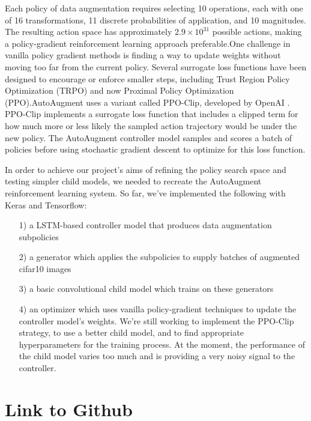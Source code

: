 \documentclass[10pt,twocolumn,letterpaper]{article}
\begin{document}
	Each policy of data augmentation requires selecting 10 operations, each with one of 16 transformations, 11 discrete probabilities of application, and 10 magnitudes.  The resulting action space has approximately $2.9 \times 10^{31}$ possible actions, making a policy-gradient reinforcement learning approach preferable.One challenge in vanilla policy gradient methods is finding a way to update weights without moving too far from the current policy. Several surrogate loss functions have been designed to encourage or enforce smaller steps, including Trust Region Policy Optimization (TRPO) and now Proximal Policy Optimization (PPO).AutoAugment uses a variant called PPO-Clip, developed by OpenAI \cite{Schulman2017}. PPO-Clip implements a surrogate loss function that includes a clipped term for how much more or less likely the sampled action trajectory would be under the new policy. The AutoAugment controller model samples and scores a batch of policies before using stochastic gradient descent to optimize for this loss function.
	
	In order to achieve our project's aims of refining the policy search space and testing simpler child models, we needed to recreate the AutoAugment reinforcement learning system. So far, we've implemented the following with Keras and Tensorflow:

	\begin{enumerate}
		\item[1)]
			a LSTM-based controller model that produces data augmentation subpolicies
		
		\item[2)]
			a generator which applies the subpolicies to supply batches of augmented cifar10 images
		
		\item[3)]
			a basic convolutional child model which trains on these generators
		
		\item[4)]
			an optimizer which uses vanilla policy-gradient techniques to update the controller model's weights. We're still working to implement the PPO-Clip strategy, to use a better child model, and to find appropriate hyperparameters for the training process.    At the moment, the performance of the child model varies too much and is providing a very noisy signal to the controller.
			
	\end{enumerate}

\section{Link to Github}
\end{document}
